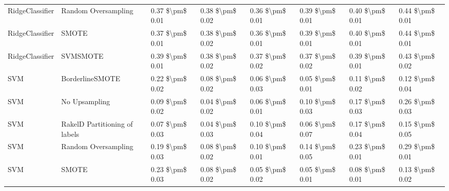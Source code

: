 \begin{tabular}{llllllll}
                RidgeClassifier &           Random Oversampling & 0.37 \$\textbackslash pm\$ 0.01 &           0.38 \$\textbackslash pm\$ 0.02 &       0.36 \$\textbackslash pm\$ 0.01 &        0.39 \$\textbackslash pm\$ 0.01 &                         0.40 \$\textbackslash pm\$ 0.01 &     0.44 \$\textbackslash pm\$ 0.01 \\
                RidgeClassifier &                         SMOTE & 0.37 \$\textbackslash pm\$ 0.01 &           0.38 \$\textbackslash pm\$ 0.02 &       0.36 \$\textbackslash pm\$ 0.01 &        0.39 \$\textbackslash pm\$ 0.01 &                         0.40 \$\textbackslash pm\$ 0.01 &     0.44 \$\textbackslash pm\$ 0.01 \\
                RidgeClassifier &                      SVMSMOTE & 0.39 \$\textbackslash pm\$ 0.01 &           0.38 \$\textbackslash pm\$ 0.02 &       0.37 \$\textbackslash pm\$ 0.02 &        0.37 \$\textbackslash pm\$ 0.02 &                         0.39 \$\textbackslash pm\$ 0.01 &     0.43 \$\textbackslash pm\$ 0.02 \\
                            SVM &               BorderlineSMOTE & 0.22 \$\textbackslash pm\$ 0.02 &           0.08 \$\textbackslash pm\$ 0.02 &       0.06 \$\textbackslash pm\$ 0.03 &        0.05 \$\textbackslash pm\$ 0.01 &                         0.11 \$\textbackslash pm\$ 0.02 &     0.12 \$\textbackslash pm\$ 0.04 \\
                            SVM &                 No Upsampling & 0.09 \$\textbackslash pm\$ 0.02 &           0.04 \$\textbackslash pm\$ 0.02 &       0.06 \$\textbackslash pm\$ 0.01 &        0.10 \$\textbackslash pm\$ 0.03 &                         0.17 \$\textbackslash pm\$ 0.03 &     0.26 \$\textbackslash pm\$ 0.03 \\
                            SVM & RakelD Partitioning of labels & 0.07 \$\textbackslash pm\$ 0.03 &           0.04 \$\textbackslash pm\$ 0.03 &       0.10 \$\textbackslash pm\$ 0.04 &        0.06 \$\textbackslash pm\$ 0.07 &                         0.17 \$\textbackslash pm\$ 0.04 &     0.15 \$\textbackslash pm\$ 0.05 \\
                            SVM &           Random Oversampling & 0.19 \$\textbackslash pm\$ 0.03 &           0.08 \$\textbackslash pm\$ 0.02 &       0.10 \$\textbackslash pm\$ 0.01 &        0.14 \$\textbackslash pm\$ 0.05 &                         0.23 \$\textbackslash pm\$ 0.01 &     0.29 \$\textbackslash pm\$ 0.01 \\
                            SVM &                         SMOTE & 0.23 \$\textbackslash pm\$ 0.03 &           0.08 \$\textbackslash pm\$ 0.02 &       0.05 \$\textbackslash pm\$ 0.02 &        0.05 \$\textbackslash pm\$ 0.01 &                         0.08 \$\textbackslash pm\$ 0.01 &     0.13 \$\textbackslash pm\$ 0.02 \\

\end{tabular}

